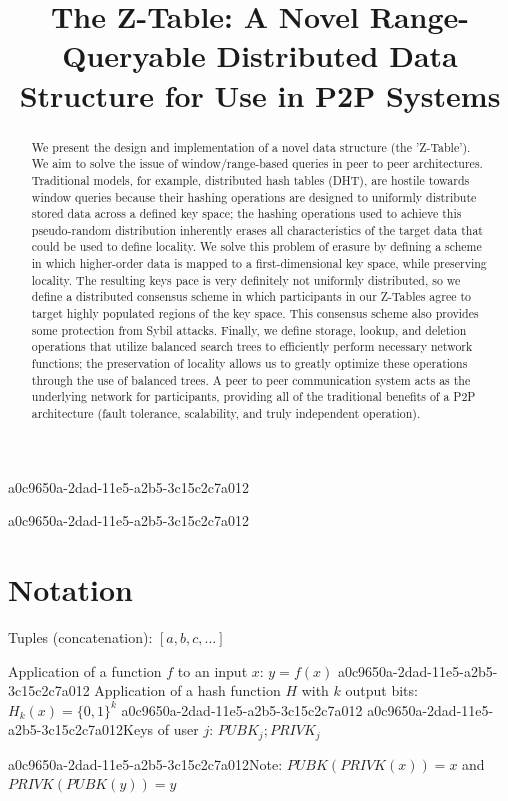 \documentclass[12pt]{article}
\title{The Z-Table: A Novel Range-Queryable Distributed Data Structure for Use in P2P Systems}
\begin{document}
\maketitle
a0c9650a-2dad-11e5-a2b5-3c15c2c7a012
\begin{abstract}
We present the design and implementation of a novel data structure (the 'Z-Table'). We aim to solve the issue of window/range-based queries in peer to peer architectures. Traditional models, for example,  distributed hash tables (DHT), are hostile towards window queries because their hashing operations are designed to uniformly distribute stored data across a defined key space; the hashing operations used to achieve this pseudo-random distribution inherently erases all characteristics of the target data that could be used to define locality. We solve this problem of erasure by defining a scheme in which higher-order data is mapped to a first-dimensional key space, while preserving locality. The resulting keys pace is very definitely not uniformly distributed, so we define a distributed consensus scheme in which participants in our Z-Tables agree to target highly populated regions of the key space. This consensus scheme also provides some protection from Sybil attacks. Finally, we define storage, lookup, and deletion operations that utilize balanced search trees to efficiently perform necessary network functions; the preservation of locality allows us to greatly optimize these operations through the use of balanced trees. A peer to peer communication system acts as the underlying network for participants, providing all of the traditional benefits of a P2P architecture (fault tolerance, scalability, and truly independent operation).
\end{abstract}

a0c9650a-2dad-11e5-a2b5-3c15c2c7a012\section{Notation}

Tuples (concatenation): $[a,b,c,...]$

Application of a function $f$ to an input $x$: $y=f(x)$
a0c9650a-2dad-11e5-a2b5-3c15c2c7a012
Application of a hash function $H$ with $k$ output bits: $H_{k}(x) = \{0,1\}^k$
a0c9650a-2dad-11e5-a2b5-3c15c2c7a012
a0c9650a-2dad-11e5-a2b5-3c15c2c7a012Keys of user $j$: $ PUBK_j; PRIVK_j $

a0c9650a-2dad-11e5-a2b5-3c15c2c7a012Note: $PUBK(PRIVK(x)) = x$ and $PRIVK(PUBK(y)) = y$~
\end{document}
